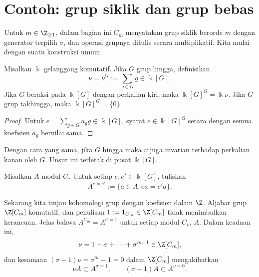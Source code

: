
\section{Contoh: grup siklik dan grup bebas}\label{sec:coh-cyclic-free}
\hypertarget{o014.aljabr2.chapter6.cyclic-and-free-groups}{ }

Untuk $m\in\Z_{\geq1}$, dalam bagian ini $C_m$ menyatakan grup siklik berorde
$m$ dengan generator terpilih $\sigma$, dan operasi grupnya ditulis secara
multiplikatif. Kita mulai dengan suatu konstruksi umum.

\begin{definition-proposition}\label{def:group-norm}
	Misalkan $\Bbbk$ gelanggang komutatif. Jika $G$ grup hingga, definisikan
	\[ \nu=\nu^G:=\sum_{g\in G}g\in\Bbbk[G]. \]
	Jika $G$ beraksi pada $\Bbbk[G]$ dengan perkalian kiri, maka
	$\Bbbk[G]^G=\Bbbk\nu$. Jika $G$ grup takhingga, maka
	$\Bbbk[G]^G=\{0\}$.
\end{definition-proposition}
\begin{proof}
	Untuk $e=\sum_{g\in G}a_gg\in\Bbbk[G]$, syarat
	$e\in\Bbbk[G]^G$ setara dengan semua koefisien $a_g$ bernilai sama.
\end{proof}

Dengan cara yang sama, jika $G$ hingga maka $\nu$ juga invarian terhadap
perkalian kanan oleh $G$. Unsur ini terletak di pusat $\Bbbk[G]$.

\begin{convention}\label{con:G-mod-equalizer}
	Misalkan $A$ modul-$G$. Untuk setiap $e,e'\in\Bbbk[G]$, tuliskan
	\[ A^{e=e'}:=\{a\in A:ea=e'a\}. \]
\end{convention}

Sekarang kita tinjau kohomologi grup dengan koefisien dalam $\Z$. Aljabar grup
$\Z[C_m]$ komutatif, dan penulisan $1:=1_{C_m}\in\Z[C_m]$ tidak menimbulkan
kerancuan. Jelas bahwa $A^{C_m}=A^{\sigma=1}$ untuk setiap modul-$C_m$ $A$.
Dalam keadaan ini,
\begin{equation*}
	\nu=1+\sigma+\cdots+\sigma^{m-1}\in\Z[C_m],
\end{equation*}
dan kesamaan $(\sigma-1)\nu=\sigma^m-1=0$ dalam $\Z[C_m]$ mengakibatkan
\[ \nu A\subset A^{\sigma=1},\qquad
	(\sigma-1)A\subset A^{\nu=0}. \]

